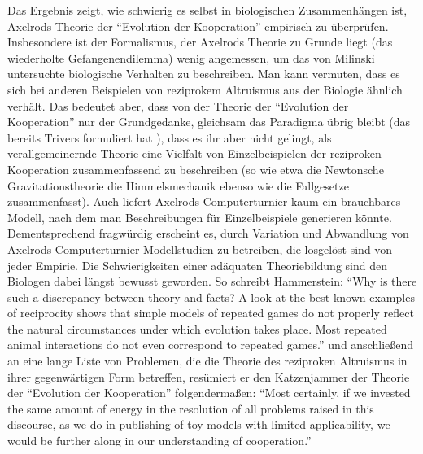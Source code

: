 \documentclass[12pt,a4paper,ngerman]{article}
\begin{document}
Das Ergebnis zeigt, wie schwierig es selbst in biologischen
Zusammenhängen ist, Axelrods Theorie der "`Evolution der Kooperation"'
empirisch zu überprüfen.  Insbesondere ist der Formalismus, der
Axelrods Theorie zu Grunde liegt (das wiederholte Gefangenendilemma)
wenig angemessen, um das von Milinski untersuchte biologische
Verhalten zu beschreiben. Man kann vermuten, dass es sich bei anderen
Beispielen von reziprokem Altruismus aus der Biologie ähnlich
verhält. Das bedeutet aber, dass von der Theorie der "`Evolution der
Kooperation"' nur der Grundgedanke, gleichsam das Paradigma übrig
bleibt (das bereits Trivers formuliert hat \cite{trivers:1971}), dass
es ihr aber nicht gelingt, als verallgemeinernde Theorie eine Vielfalt
von Einzelbeispielen der reziproken Kooperation zusammenfassend zu
beschreiben (so wie etwa die Newtonsche Gravitationstheorie die
Himmelsmechanik ebenso wie die Fallgesetze zusammenfasst). Auch
liefert Axelrods Computerturnier kaum ein brauchbares Modell, nach dem
man Beschreibungen für Einzelbeispiele generieren könnte.
Dementsprechend fragwürdig erscheint es, durch Variation und
Abwandlung von Axelrods Computerturnier Modellstudien zu betreiben,
die losgelöst sind von jeder Empirie. Die Schwierigkeiten einer
adäquaten Theoriebildung sind den Biologen dabei längst bewusst
geworden. So schreibt Hammerstein: "`Why is there such a discrepancy
between theory and facts? A look at the best-known examples of
reciprocity shows that simple models of repeated games do not properly
reflect the natural circumstances under which evolution takes
place. Most repeated animal interactions do not even correspond to
repeated games."'
\cite[S. 83]{hammerstein:2003a} und anschließend an eine lange Liste von
Problemen, die die Theorie des reziproken Altruismus in ihrer
gegenwärtigen Form betreffen, resümiert er den Katzenjammer der
Theorie der "`Evolution der Kooperation"' folgendermaßen: "`Most
certainly, if we invested the same amount of energy in the resolution
of all problems raised in this discourse, as we do in publishing of
toy models with limited applicability, we would be further along in
our understanding of cooperation."' \cite[S. 92]{hammerstein:2003a}
\end{document}
